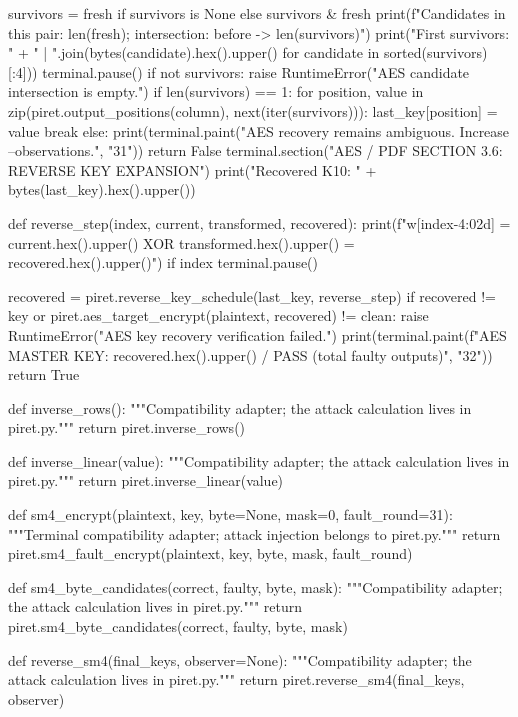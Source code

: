 \begin{lightcode}[numbers=left,firstnumber=1]
            survivors = fresh if survivors is None else survivors & fresh
            print(f"Candidates in this pair: {len(fresh)}; intersection: {before} -> {len(survivors)}")
            print("First survivors: " + " | ".join(bytes(candidate).hex().upper() for candidate in sorted(survivors)[:4]))
            terminal.pause()
            if not survivors:
                raise RuntimeError("AES candidate intersection is empty.")
            if len(survivors) == 1:
                for position, value in zip(piret.output_positions(column), next(iter(survivors))):
                    last_key[position] = value
                break
        else:
            print(terminal.paint("AES recovery remains ambiguous. Increase --observations.", "31"))
            return False
    terminal.section("AES / PDF SECTION 3.6: REVERSE KEY EXPANSION")
    print("Recovered K10: " + bytes(last_key).hex().upper())

    def reverse_step(index, current, transformed, recovered):
        print(f"w[{index-4:02d}] = {current.hex().upper()} XOR {transformed.hex().upper()} = {recovered.hex().upper()}")
        if index %
            terminal.pause()

    recovered = piret.reverse_key_schedule(last_key, reverse_step)
    if recovered != key or piret.aes_target_encrypt(plaintext, recovered) != clean:
        raise RuntimeError("AES key recovery verification failed.")
    print(terminal.paint(f"AES MASTER KEY: {recovered.hex().upper()} / PASS ({total} faulty outputs)", "32"))
    return True


def inverse_rows():
    """Compatibility adapter; the attack calculation lives in piret.py."""
    return piret.inverse_rows()


def inverse_linear(value):
    """Compatibility adapter; the attack calculation lives in piret.py."""
    return piret.inverse_linear(value)


def sm4_encrypt(plaintext, key, byte=None, mask=0, fault_round=31):
    """Terminal compatibility adapter; attack injection belongs to piret.py."""
    return piret.sm4_fault_encrypt(plaintext, key, byte, mask, fault_round)


def sm4_byte_candidates(correct, faulty, byte, mask):
    """Compatibility adapter; the attack calculation lives in piret.py."""
    return piret.sm4_byte_candidates(correct, faulty, byte, mask)


def reverse_sm4(final_keys, observer=None):
    """Compatibility adapter; the attack calculation lives in piret.py."""
    return piret.reverse_sm4(final_keys, observer)



\end{lightcode}
